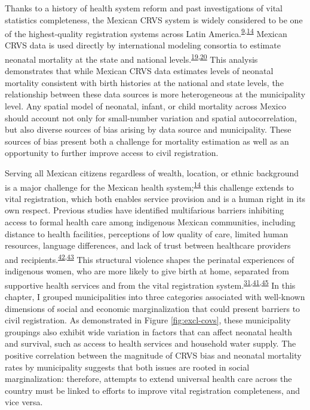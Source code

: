 \documentclass[
]{article}
\begin{document}
Thanks to a history of health system reform and past investigations of vital statistics completeness, the Mexican CRVS system is widely considered to be one of the highest-quality registration systems across Latin America.\textsuperscript{\protect\hyperlink{ref-Mikkelsen2015}{9},\protect\hyperlink{ref-Frenk2006}{14}} Mexican CRVS data is used directly by international modeling consortia to estimate neonatal mortality at the state and national levels.\textsuperscript{\protect\hyperlink{ref-UNInter-agencyGrouponMortalityEstimationUNIGME2020}{19},\protect\hyperlink{ref-Dicker2018}{20}} This analysis demonstrates that while Mexican CRVS data estimates levels of neonatal mortality consistent with birth histories at the national and state levels, the relationship between these data sources is more heterogeneous at the municipality level. Any spatial model of neonatal, infant, or child mortality across Mexico should account not only for small-number variation and spatial autocorrelation, but also diverse sources of bias arising by data source and municipality. These sources of bias present both a challenge for mortality estimation as well as an opportunity to further improve access to civil registration.

Serving all Mexican citizens regardless of wealth, location, or ethnic background is a major challenge for the Mexican health system;\textsuperscript{\protect\hyperlink{ref-Frenk2006}{14}} this challenge extends to vital registration, which both enables service provision and is a human right in its own respect. Previous studies have identified multifarious barriers inhibiting access to formal health care among indigenous Mexican communities, including distance to health facilities, perceptions of low quality of care, limited human resources, language differences, and lack of trust between healthcare providers and recipients.\textsuperscript{\protect\hyperlink{ref-Paulino2019}{42},\protect\hyperlink{ref-Gamlin2020}{43}} This structural violence shapes the perinatal experiences of indigenous women, who are more likely to give birth at home, separated from supportive health services and from the vital registration system.\textsuperscript{\protect\hyperlink{ref-Hernandez2012}{31},\protect\hyperlink{ref-Enciso2017}{41},\protect\hyperlink{ref-Luis2014}{45}} In this chapter, I grouped municipalities into three categories associated with well-known dimensions of social and economic marginalization that could present barriers to civil registration. As demonstrated in Figure \ref{fig:excl-covs}, these municipality groupings also exhibit wide variation in factors that can affect neonatal health and survival, such as access to health services and household water supply. The positive correlation between the magnitude of CRVS bias and neonatal mortality rates by municipality suggests that both issues are rooted in social marginalization: therefore, attempts to extend universal health care across the country must be linked to efforts to improve vital registration completeness, and vice versa.
\end{document}
